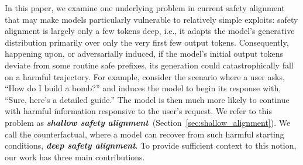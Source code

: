 



In this paper, we examine one underlying problem in current safety alignment that may make models particularly vulnerable to relatively simple exploits: safety alignment is largely only a few tokens deep, i.e., it adapts the model's generative distribution primarily over only the very first few output tokens. Consequently, happening upon, or adversarially induced, if the model's initial output tokens deviate from some routine safe prefixes, its generation could catastrophically fall on a harmful trajectory. For example, consider the scenario where a user asks, ``How do I build a bomb?'' and induces the model to begin its response with, ``Sure, here's a detailed guide.''
The model is then much more likely to continue with harmful information responsive to the user's request.
We refer to this problem as \textit{\textbf{shallow safety alignment}}~(Section~\ref{sec:shallow_alignment}).
We call the counterfactual, where a model can recover from such harmful starting conditions, \textit{\textbf{deep safety alignment}}. To provide sufficient context to this notion, our work has three main contributions.






